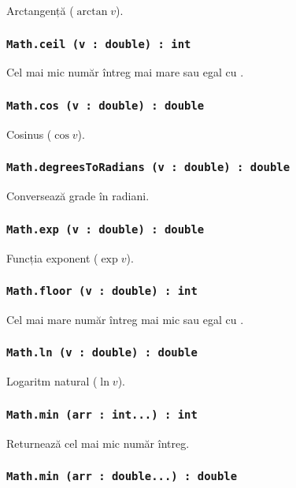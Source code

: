 Arctangență ($\arctan{v}$).

\subsubsection{\lstinline|Math.ceil (v : double) : int|}

Cel mai mic număr întreg mai mare sau egal cu .

\subsubsection{\lstinline|Math.cos (v : double) : double|}

Cosinus ($\cos{v}$).

\subsubsection{\lstinline|Math.degreesToRadians (v : double) : double|}

Conversează grade în radiani.

\subsubsection{\lstinline|Math.exp (v : double) : double|}

Funcția exponent ($\exp{v}$).

\subsubsection{\lstinline|Math.floor (v : double) : int|}

Cel mai mare număr întreg mai mic sau egal cu .

\subsubsection{\lstinline|Math.ln (v : double) : double|}

Logaritm natural ($\ln{v}$).

\subsubsection{\lstinline|Math.min (arr : int...) : int|}

Returnează cel mai mic număr întreg.

\subsubsection{\lstinline|Math.min (arr : double...) : double|}

